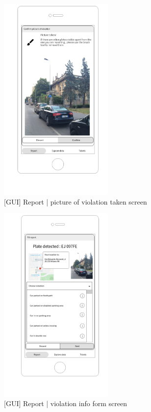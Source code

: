 \begin{figure}[H]
		\centering
      \includegraphics[width=0.5\textwidth]{GUI/picturetaken.png}
      \caption{[GUI] Report | picture of violation taken screen}   \label{fig:pictaken}
\end{figure}


\begin{figure}[H]
		\centering
      \includegraphics[width=0.5\textwidth]{GUI/fillform.png}
      \caption{[GUI] Report | violation info form screen}   \label{fig:fillform}
\end{figure}


